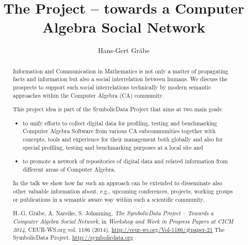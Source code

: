\documentclass{dmv-ptm}
\title{The {\SD} Project -- towards a Computer Algebra Social Network}
\author{Hans-Gert Gr\"abe}
\newcommand{\SD}{{\sc Symbolic\-Data}}
\begin{document}
\maketitle

\begin{abstract} %

Information and Communication in Mathematics is not only a matter of
propagating facts and information but also a social interrelation between
humans.  We discuss the prospects to support such social interrelations
technically by modern semantic approaches within the Computer Algebra (CA)
community.

This project idea is part of the {\SD} Project \cite{ref-02} that aims at
two main goals: 
\begin{itemize}
\item to unify efforts to collect digital data for profiling, testing and
  benchmarking Computer Algebra Software from various CA subcommunities
  together with concepts, tools and experience for their management both
  globally and also for special profiling, testing and benchmarking purposes
  at a local site and
\item to promote a network of repositories of digital data and related
  information from different areas of Computer Algebra.
\end{itemize}
In the talk we show how far such an approach can be extended to disseminate
also other valuable information about, e.g., upcoming conferences, projects,
working groups or publications in a semantic aware way within such a
scientific community.

\begin{thebibliography}{22}
 H.-G. Gr\"abe, A. Nareike, S. Johanning, \emph{The
  SymbolicData Project -- Towards a Computer Algebra Social Network}, in
  \emph{Workshop and Work in Progress Papers at CICM 2014}, CEUR-WS.org
  vol. 1186 (2014), \url{http://ceur-ws.org/Vol-1186/#paper-21}
 The {\SD} Project. \url{http://symbolicdata.org} 
\end{thebibliography}

\end{abstract}
\end{document}
